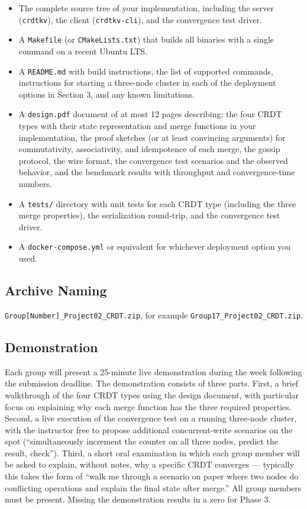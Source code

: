 \documentclass[11pt,a4paper]{article}
\begin{document}
\begin{itemize}
\item The complete source tree of your implementation, including the server (\texttt{crdtkv}), the client (\texttt{crdtkv-cli}), and the convergence test driver.

\item A \texttt{Makefile} (or \texttt{CMakeLists.txt}) that builds all binaries with a single command on a recent Ubuntu LTS.

\item A \texttt{README.md} with build instructions, the list of supported commands, instructions for starting a three-node cluster in each of the deployment options in Section 3, and any known limitations.

\item A \texttt{design.pdf} document of at most 12 pages describing: the four CRDT types with their state representation and merge functions in your implementation, the proof sketches (or at least convincing arguments) for commutativity, associativity, and idempotence of each merge, the gossip protocol, the wire format, the convergence test scenarios and the observed behavior, and the benchmark results with throughput and convergence-time numbers.

\item A \texttt{tests/} directory with unit tests for each CRDT type (including the three merge properties), the serialization round-trip, and the convergence test driver.

\item A \texttt{docker-compose.yml} or equivalent for whichever deployment option you used.
\end{itemize}

\subsection{Archive Naming}
\texttt{Group[Number]\_Project02\_CRDT.zip}, for example \texttt{Group17\_Project02\_CRDT.zip}.

\subsection{Demonstration}
Each group will present a 25-minute live demonstration during the week following the submission deadline. The demonstration consists of three parts. First, a brief walkthrough of the four CRDT types using the design document, with particular focus on explaining why each merge function has the three required properties. Second, a live execution of the convergence test on a running three-node cluster, with the instructor free to propose additional concurrent-write scenarios on the spot (``simultaneously increment the counter on all three nodes, predict the result, check''). Third, a short oral examination in which each group member will be asked to explain, without notes, why a specific CRDT converges --- typically this takes the form of ``walk me through a scenario on paper where two nodes do conflicting operations and explain the final state after merge.'' All group members must be present. Missing the demonstration results in a zero for Phase 3.
\end{document}
